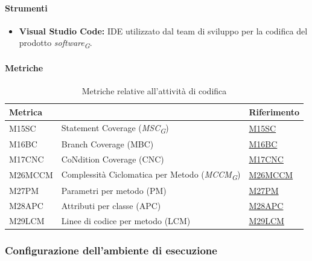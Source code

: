 \vspace{0.1cm}

\paragraph{Strumenti}
\begin{itemize}
    \item \textbf{Visual Studio Code:} IDE utilizzato dal team di sviluppo per la codifica del prodotto \textit{software}\textsubscript{\textit{G}}.
\end{itemize}

\vspace{0.1cm}

\paragraph{Metriche} 
\begin{table}[H]
    \centering
    \begin{tabular}{|C{3cm}|C{4cm}|C{3cm}|}
    \hline
    \textbf{Metrica} &  & \textbf{Riferimento} \\
    \hline \hline
    M15SC & Statement Coverage (\textit{MSC}\textsubscript{\textit{G}}) &  \hyperlink{item:M15SC}{M15SC} \\
    M16BC & Branch Coverage (MBC) &  \hyperlink{item:M16BC}{M16BC} \\
    M17CNC & CoNdition Coverage (CNC) &  \hyperlink{item:M17CNC}{M17CNC} \\
    M26MCCM & Complessità Ciclomatica per Metodo (\textit{MCCM}\textsubscript{\textit{G}}) &  \hyperlink{item:M26MCCM}{M26MCCM} \\
    M27PM & Parametri per metodo (PM) & \hyperlink{item:M27PM}{M27PM} \\
    M28APC & Attributi per classe (APC) & \hyperlink{item:M28APC}{M28APC} \\
    M29LCM & Linee di codice per metodo (LCM) & \hyperlink{item:M29LCM}{M29LCM} \\ 
    \hline
    \end{tabular}
    \caption{Metriche relative all'attività di codifica}
\end{table}

\pagebreak

\subsubsection{Configurazione dell'ambiente di esecuzione}


